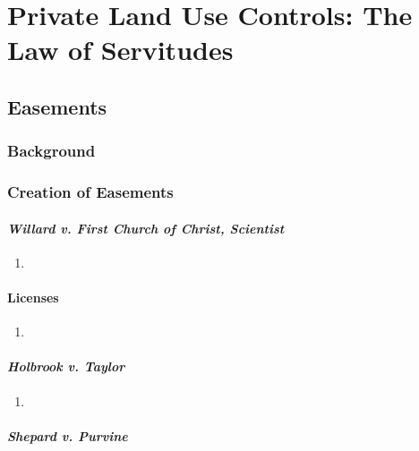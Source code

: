 \section{Private Land Use Controls: The Law of Servitudes}


\subsection{Easements}

\subsubsection{Background}


\subsubsection{Creation of Easements}

\paragraph{\emph{Willard v. First Church of Christ, Scientist}}

\begin{enumerate}
    \item %
\end{enumerate}

\paragraph{Licenses}

\begin{enumerate}
    \item %
\end{enumerate}

\paragraph{\emph{Holbrook v. Taylor}}

\begin{enumerate}
    \item %
\end{enumerate}

\paragraph{\emph{Shepard v. Purvine}}

